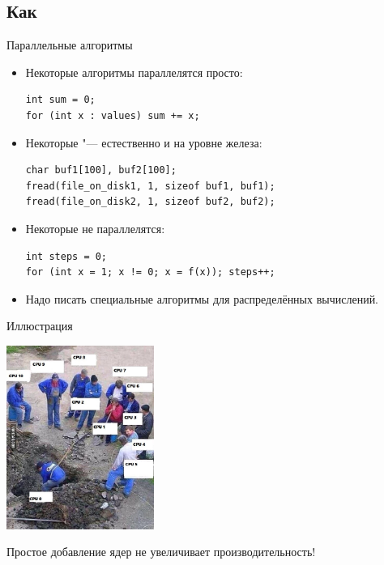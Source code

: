 \subsection{Как}
\begin{frame}[fragile]{Параллельные алгоритмы}
	\begin{itemize}
		\item Некоторые алгоритмы параллелятся просто:
\begin{verbatim}
int sum = 0;
for (int x : values) sum += x;
\end{verbatim}
		\item Некоторые "--- естественно и на уровне железа:
\begin{verbatim}
char buf1[100], buf2[100];
fread(file_on_disk1, 1, sizeof buf1, buf1);
fread(file_on_disk2, 1, sizeof buf2, buf2);
\end{verbatim}
		\item Некоторые не параллелятся:
\begin{verbatim}
int steps = 0;
for (int x = 1; x != 0; x = f(x)); steps++;
\end{verbatim}
		\item Надо писать специальные алгоритмы для распределённых вычислений.
	\end{itemize}
\end{frame}

\begin{frame}{Иллюстрация}
	\begin{center}
		\includegraphics[height=6cm]{cpus-joke.jpg}

		Простое добавление ядер не увеличивает производительность!
	\end{center}
\end{frame}

